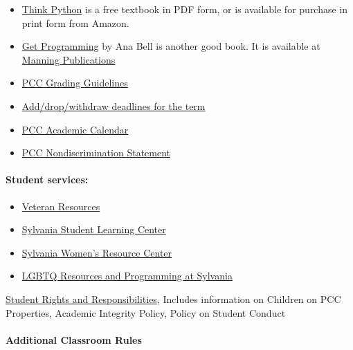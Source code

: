 \documentclass[11pt]{article}
\begin{document}
\begin{itemize}
\item
  \href{http://greenteapress.com/think-python}{Think Python} is a free
  textbook in PDF form, or is available for purchase in print form from
  Amazon.
\item
  \href{https://www.manning.com/books/get-programming}{Get Programming}
  by Ana Bell is another good book. It is available at
  \href{https://www.manning.com/}{Manning Publications}
\item
  \href{http://www.pcc.edu/resources/academic/standards-practices/AcademicStandardsandPractices-GradingGuidelines.html}{PCC
  Grading Guidelines}
\item
  \href{http://www.pcc.edu/registration/dropping.html}{Add/drop/withdraw
  deadlines for the term}
\item
  \href{http://www.pcc.edu/registration/academic-calendar.html}{PCC
  Academic Calendar}
\item
  \href{https://www.pcc.edu/about/equity-inclusion/eeo-statement.html}{PCC
  Nondiscrimination Statement}
\end{itemize}

\hypertarget{student-services}{%
\paragraph{Student services:}\label{student-services}}

\begin{itemize}
\item
  \href{https://www.pcc.edu/resources/veterans/}{Veteran Resources}
\item
  \href{http://www.pcc.edu/resources/tutoring/sylvania/student-success/}{Sylvania
  Student Learning Center}
\item
  \href{https://www.pcc.edu/resources/women/sylvania/}{Sylvania Women's
  Resource Center}
\item
  \href{https://www.pcc.edu/resources/qrc/sylvania/}{LGBTQ Resources and
  Programming at Sylvania}
\end{itemize}

\href{http://www.pcc.edu/about/policy/student-rights/}{Student Rights
and Responsibilities}, Includes information on Children on PCC
Properties, Academic Integrity Policy, Policy on Student Conduct

\hypertarget{additional-classroom-rules}{%
\paragraph{Additional Classroom
Rules}\label{additional-classroom-rules}}
\end{document}
